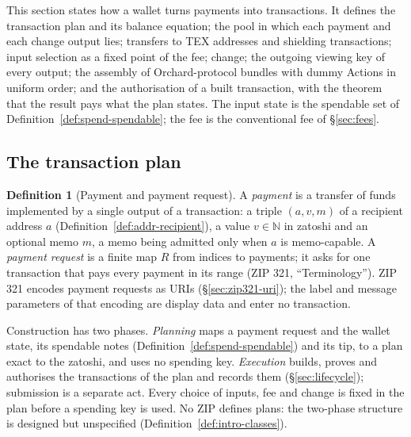 \documentclass[11pt,a4paper]{article}
\theoremstyle{definition}
\newtheorem{definition}[theorem]{Definition}
\newcommand{\N}{\mathbb{N}}
\begin{document}
This section states how a wallet turns payments into transactions. It
defines the transaction plan and its balance equation; the pool in which
each payment and each change output lies; transfers to TEX addresses and
shielding transactions; input selection as a fixed point of the fee; change;
the outgoing viewing key of every output; the assembly of Orchard-protocol
bundles with dummy Actions in uniform order; and the authorisation of a
built transaction, with the theorem that the result pays what the plan
states. The input state is the spendable set of
Definition~\ref{def:spend-spendable}; the fee is the conventional fee of
\S\ref{sec:fees}.

\subsection{The transaction plan}\label{sec:pipeline-plan}

\begin{definition}[Payment and payment request]\label{def:plan-payment}
A \emph{payment} is a transfer of funds implemented by a single output of a
transaction: a triple $(a, v, m)$ of a recipient address $a$
(Definition~\ref{def:addr-recipient}), a value $v \in \N$ in zatoshi and an
optional memo $m$, a memo being admitted only when $a$ is memo-capable. A
\emph{payment request} is a finite map $R$ from indices to payments; it asks
for one transaction that pays every payment in its range (ZIP 321,
``Terminology''). ZIP 321 encodes payment requests as URIs
(\S\ref{sec:zip321-uri}); the label and message parameters of that encoding
are display data and enter no transaction.
\end{definition}

Construction has two phases. \emph{Planning} maps a payment request and the
wallet state, its spendable notes (Definition~\ref{def:spend-spendable}) and
its tip, to a plan exact to the zatoshi, and uses no spending key.
\emph{Execution} builds, proves and authorises the transactions of the plan
and records them (\S\ref{sec:lifecycle}); submission is a separate act.
Every choice of inputs, fee and change is fixed in the plan before a
spending key is used. No ZIP defines plans: the two-phase structure is
designed but unspecified (Definition~\ref{def:intro-classes}).
\end{document}
